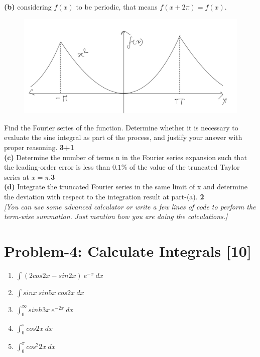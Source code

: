 \documentclass[12pt, a4paper]{article}
\begin{document}
\noindent
\textbf{(b)} considering $f(x)$ to be periodic, that means $f(x + 2\pi) = f(x)$.
\begin{figure}[h]
    \centering
    \includegraphics[scale=.25]{figs/a0-p3-x^2fourier.jpeg}
\end{figure}

\noindent
Find the Fourier series of the function. 
Determine whether it is necessary to evaluate the sine integral as part of the process,
and justify your answer with proper reasoning. \hfill\textbf{3+1}\\

\noindent
\textbf{(c)} Determine the number of terms n in the Fourier series expansion such that the leading-order
error is less than $0.1\%$ of the value of the truncated Taylor series at $x=\pi$.\hfill\textbf{3}\\

\noindent
\textbf{(d)} Integrate the truncated Fourier series in the same limit of x and determine the
deviation with respect to the integration result at part-(a). \hfill\textbf{2}\\
\textit{[You can use some advanced calculator or write a few lines of code to perform the term-wise summation. 
Just mention how you are doing the calculations.]}

\section*{Problem-4: Calculate Integrals \hfill \textbf{[10]}}
\begin{enumerate}
    \item $\int (2cos2x - sin2x)\ e^{-x}\ dx$
    \item $\int sinx\ sin5x\ cos2x\ dx$
    \item $\int_{0}^{\infty}sinh3x\ e^{-2x}\ dx$
    \item $\int_{0}^{\pi}cos2x\ dx$
    \item $\int_{0}^{\pi}cos^{2}2x\ dx$
\end{enumerate}
\end{document}
